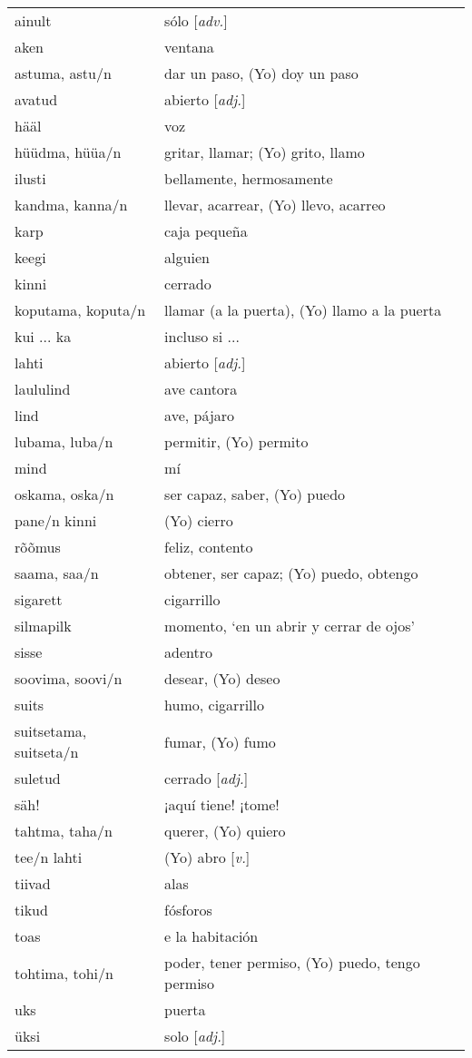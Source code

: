 \begin{tabular}{ l l }
	ainult					& sólo [\emph{adv.}] \\
	aken					& ventana \\
	astuma, astu/n			& dar un paso, (Yo) doy un paso \\
	avatud					& abierto [\emph{adj.}] \\
	hääl					& voz \\
	hüüdma,	hüüa/n			& gritar, llamar; (Yo) grito, llamo \\
	ilusti					& bellamente, hermosamente \\
	kandma, kanna/n			& llevar, acarrear, (Yo) llevo, acarreo \\
	karp					& caja pequeña  \\
	keegi					& alguien \\
	kinni					& cerrado \\
	koputama, koputa/n		& llamar (a la puerta), (Yo) llamo a la puerta \\
	kui ... ka				& incluso si ... \\
	lahti					& abierto [\emph{adj.}] \\
	laululind				& ave cantora \\
	lind					& ave, pájaro \\
	lubama, luba/n			& permitir, (Yo) permito \\
	mind					& mí \\
	oskama, oska/n			& ser capaz, saber, (Yo) puedo \\
	pane/n kinni			& (Yo) cierro \\
	rõõmus					& feliz, contento \\
	saama, saa/n			& obtener, ser capaz; (Yo) puedo, obtengo \\
	sigarett				& cigarrillo \\
	silmapilk				& momento, `en un abrir y cerrar de ojos' \\
	sisse					& adentro  \\
	soovima, soovi/n		& desear, (Yo) deseo \\
	suits					& humo, cigarrillo \\
	suitsetama, suitseta/n	& fumar, (Yo) fumo \\
	suletud					& cerrado [\emph{adj.}] \\
	säh!					& ¡aquí tiene! ¡tome! \\
	tahtma, taha/n			& querer, (Yo) quiero  \\
	tee/n lahti				& (Yo) abro [\emph{v.}] \\
	tiivad					& alas \\
	tikud					& fósforos \\
	toas					& e la habitación  \\
	tohtima, tohi/n			& poder, tener permiso, (Yo) puedo, tengo permiso \\
	uks						& puerta \\
	üksi					& solo [\emph{adj.}]
\end{tabular}

